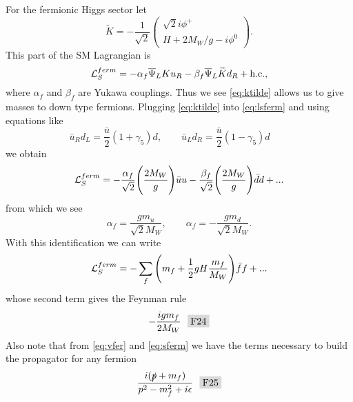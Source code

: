For the fermionic Higgs sector let
\begin{equation}
  \label{eq:ktilde}
  \widetilde{K}=-\frac{1}{\sqrt{2}}
  \left(\begin{array}{c}
    \sqrt{2}i\phi^+ \\
    H+2M_{W}/g-i\phi^0
  \end{array}\right).
\end{equation}
This part of the SM Lagrangian is
\begin{equation}
  \label{eq:lsferm}
  \mathcal{L}_S^{ferm}=-\alpha_f \overline{\Psi}_L Ku_R
                 -\beta_f \overline{\Psi}_L\widetilde{K}d_R+\text{h.c.},
\end{equation}
where $\alpha_f$ and $\beta_f$ are Yukawa couplings. Thus we see
\eqref{eq:ktilde} allows us to give masses to down type fermions. Plugging
\eqref{eq:ktilde} into \eqref{eq:lsferm} and using equations like
\begin{equation}
  \bar{u}_R d_L=\frac{\bar{u}}{2}(1+\gamma_5)d, \qquad
  \bar{u}_L d_R=\frac{\bar{u}}{2}(1-\gamma_5)d \qquad
\end{equation}
we obtain
\begin{equation}
  \mathcal{L}_S^{ferm}=-\frac{\alpha_f}{\sqrt{2}}\Bigg(\frac{2M_W}{g}\Bigg)\bar{u}u
                -\frac{\beta_f}{\sqrt{2}}\Bigg(\frac{2M_W}{g}\Bigg)\bar{d}d
                +...
\end{equation}
from which we see
\begin{equation}
  \alpha_f=\frac{gm_u}{\sqrt{2}M_W}, \qquad
  \alpha_f=-\frac{gm_d}{\sqrt{2}M_W}.
\end{equation}
With this identification we can write
\begin{equation}
  \label{eq:sferm}
  \mathcal{L}_S^{ferm}=-\sum\limits_f 
          \Bigg(m_f+\frac{1}{2}gH\frac{m_f}{M_W}\Bigg)\bar{f}f+...
\end{equation}
whose second term gives the Feynman rule
\begin{gather*}
  -\frac{igm_f}{2M_W}~~\F{24}
\end{gather*}
Also note that from \eqref{eq:vfer} and
\eqref{eq:sferm} we have the terms necessary to build the propagator for
any fermion
\begin{gather*}
  \frac{i(\slashed{p}+m_f)}{p^2-m_f^2+i\epsilon}~~\F{25}
\end{gather*}

